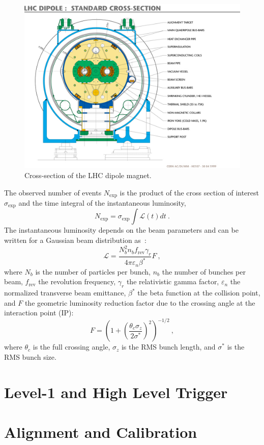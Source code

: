 \begin{figure}
\includegraphics[width=.9\textwidth,clip=true,viewport=0 20 680 550]{figs/cms/lhc-pho-1999-172.jpg}
\caption{Cross-section of the LHC dipole magnet.\label{fig:LHCDipole}}
\end{figure}


The observed number of events $N_{\mathrm{exp}}$ is the product of the cross
section of interest $\sigma_{\mathrm{exp}}$ and the time integral of
the instantaneous luminosity,
\begin{equation}
N_{\mathrm{exp}}  =\sigma_{\mathrm{exp}}\int \mathscr{L}(t)dt ~.
\end{equation}
The instantaneous luminosity depends on the beam parameters and
can be written for a Gaussian beam distribution as~\cite{LHCMachine}:
\begin{equation}
\mathscr{L} =
\frac{N_b^2n_bf_{\mathrm{rev}}\gamma_r}{4\pi\varepsilon_n\beta^{\ast}}F~,
\label{eqn:instlumi}
\end{equation}
where $N_b$ is the number of particles per bunch, $n_b$ the number
of bunches per beam, $f_{\mathrm{rev}}$ the revolution frequency,
$\gamma_r$ the relativistic gamma factor, $\varepsilon_n$ the
normalized transverse beam emittance, $\beta^{\ast}$ the beta function
at the collision point, and $F$ the geometric luminosity reduction
factor due to the crossing angle at the interaction point (IP):
\begin{equation}
F=\left(1+\left(\frac{\theta_c\sigma_z}{2\sigma^{\ast}}\right)^2\right)^{-1/2}~,
\label{eqn:F}
\end{equation}
where $\theta_c$ is the full crossing angle, $\sigma_z$ is the RMS
bunch length, and $\sigma^{\ast}$ is the RMS bunch size.

\section {Level-1 and High Level Trigger}

\section{Alignment and Calibration}
